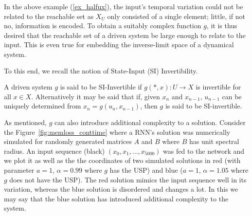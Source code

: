 



In the above example (\ref{ex_halfux}), the input's temporal variation could not be related to the reachable set as $X_U$ only consisted of a single element; little, if not no, information is encoded.
To obtain a suitably complex function $g$, it is thus desired that the reachable set of a driven system  be large enough to relate to the input. 
This is even true for embedding  the inverse-limit space of a dynamical system. 

 To this end, we recall the notion of State-Input (SI) Invertibility.  

\begin{Definition}
  [\bf SI-Invertibility]\label{Dfn_SIinv}\rm
  A driven system $g$ is said to be SI-Invertible if $g(*,x): U \to X$ is invertible for all $x\in X$. Alternatively it may be said that if, given $x_n$ and $x_{n-1}$, $u_{n-1}$ can be uniquely determined from $x_n=g(u_n,x_{n-1})$, then $g$ is said to be SI-invertible.
\end{Definition}

As mentioned, $g$ can also introduce additional complexity to a solution. Consider the Figure~\ref{fig:memloss_conttime} where a RNN's solution was numerically simulated for randomly generated matrices $A$ and $B$ where $B$ has unit spectral radius.
An input sequence (black) $(x_0,x_1,\ldots,x_{5000})$ was fed to the network and we plot it as well as the the coordinates of two simulated solutions in red (with parameter $a=1$, $\alpha=0.99$ where $g$ has the USP) and blue ($a=1$, $\alpha=1.05$ where $g$ does not have the USP).
The red solution mimics the input sequence well in its variation, whereas the blue solution is disordered and changes a lot. In this we may say that the blue solution has introduced additional complexity to the system.  

